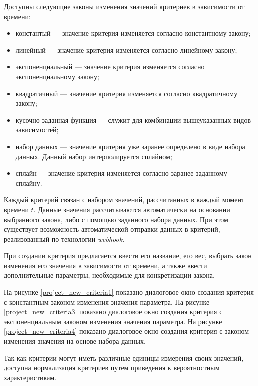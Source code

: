 Доступны следующие законы изменения значений критериев в зависимости от времени:
\begin{itemize}
    \item константый --- значение критерия изменяется согласно константному закону;
    \item линейный --- значение критерия изменяется согласно линейному закону;
    \item экспоненциальный --- значение критерия изменяется согласно экспоненциальному закону;
    \item квадратичный --- значение критерия изменяется согласно квадратичному закону;
    \item кусочно-заданная функция --- служит для комбинации вышеуказанных видов зависимостей;
    \item набор данных --- значение критерия уже заранее определено в виде набора данных. Данный набор интерполируется сплайном;
    \item сплайн --- значение критерия изменяется согласно заранее заданному сплайну.
\end{itemize}

Каждый критерий связан с набором значений, рассчитанных в каждый момент времени $t$. 
Данные значения рассчитываются автоматически на основании выбранного закона, либо с помощью заданного набора данных.
При этом существует возможность автоматической отправки данных в критерий, реализованный по технологии \emph{webhook}.

При создании критерия предлагается ввести его название, его вес, выбрать закон изменения его значения в зависимости от времени, 
а также ввести дополнительные параметры, необходимые для конкретизации закона.

На рисунке \ref{project_new_criteria1} показано диалоговое окно создания критерия с константным законом изменения значения параметра.
На рисунке \ref{project_new_criteria3} показано диалоговое окно создания критерия с экспоненциальным законом изменения значения параметра.
На рисунке \ref{project_new_criteria4} показано диалоговое окно создания критерия с законом изменения значения на основе набора данных.


Так как критерии могут иметь различные единицы измерения своих значений, доступна нормализация критериев путем приведения к вероятностным характеристикам.

